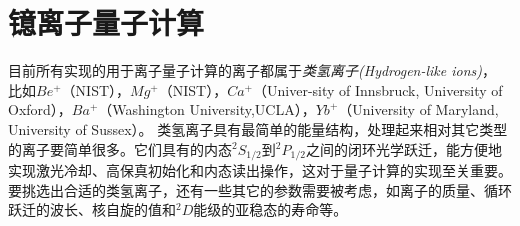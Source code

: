 











\section[镱离子量子计算]{镱离子量子计算\label{section:yb_computation}}
目前所有实现的用于离子量子计算的离子都属于\emph{类氢离子(Hydrogen-like ions)}， 比如$Be^+$（NIST\cite[]{Monroe_Meekhof_King_Itano_Wineland_2002,Lin_Gaebler_Reiter_Tan_Bowler_Wan_Keith_Knill_Glancy_Coakley_et_al_2016}），$Mg^+$（NIST\cite[]{Barrett_Schaetz_DeMarco_Britton_Chiaverini_Itano_Jelenkovic_Jost_Langer_Leibfried_et_al_2003, Wan_Kienzler_Erickson_Mayer_Tan_Wu_Vasconcelos_Glancy_Knill_Wineland_et_al_2019}），$Ca^+$（Univer-sity of Innsbruck\cite[]{Lanyon_Hempel_Nigg_Müller_Gerritsma_Zähringer_Schindler_Barreiro_Rambach_Kirchmair_et_al_2011,Monz_Nigg_Martinez_Brandl_Schindler_Rines_Wang_Chuang_Blatt_2016}, University of Oxford\cite[]{Ballance_Harty_Linke_Sepiol_Lucas_2016,Schäfer_Ballance_Thirumalai_Stephenson_Ballance_Steane_Lucas_2018}），$Ba^+$（Washington University\cite[]{Dietrich_2009,Dietrich_Kurz_Noel_Shu_Blinov_2010},UCLA\cite[]{Hucul_Christensen_Hudson_Campbell_2017}），$Yb^+$（University of Maryland\cite[]{Olmschenk_Younge_Moehring_Matsukevich_Maunz_Monroe_2007,Debnath_Linke_Figgatt_Landsman_Wright_Monroe_2016}, University of Sussex\cite[]{Weidt_Randall_Webster_Lake_Webb_Cohen_Navickas_Lekitsch_Retzker_Hensinger_2016}）。
类氢离子具有最简单的能量结构，处理起来相对其它类型的离子要简单很多。它们具有的内态$^2S_{1/2}$到$^2P_{1/2}$之间的闭环光学跃迁，能方便地实现激光冷却、高保真初始化和内态读出操作\cite[]{Harty_Allcock_Ballance_Guidoni_Janacek_Linke_Stacey_Lucas_2014}，这对于量子计算的实现至关重要。要挑选出合适的类氢离子，还有一些其它的参数需要被考虑，如离子的质量、循环跃迁的波长、核自旋的值和$^2D$能级的亚稳态的寿命等\cite[]{Bruzewicz_Chiaverini_McConnell_Sage_2019}。


